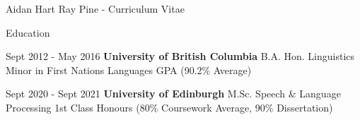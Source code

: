 \documentclass[12pt]{letter}
\date{}
\begin{document}
        \begin{cv}{ Aidan Hart Ray Pine  \space - \space   Curriculum Vitae}
        \vspace{1mm}
      \begin{cvlist}{Education}
                        
                    \item[Sept 2012 - May 2016] \textbf{University of British Columbia}
                \newline B.A. Hon. Linguistics
                \newline Minor in First Nations Languages
                 GPA (90.2\% Average)
        
                        
                    \item[Sept 2020 - Sept 2021] \textbf{University of Edinburgh}
                \newline M.Sc. Speech \& Language Processing
                \newline 1st Class Honours (80\% Coursework Average, 90\% Dissertation)
                \newline 
        
                    \end{cvlist}
        

\end{cv}
\end{document}
